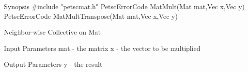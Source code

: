 Synopsis
#include "petscmat.h"
PetscErrorCode MatMult(Mat mat,Vec x,Vec y)
PetscErrorCode MatMultTranspose(Mat mat,Vec x,Vec y)

Neighbor-wise Collective on Mat

Input Parameters
mat - the matrix
x - the vector to be multiplied

Output Parameters
y - the result
